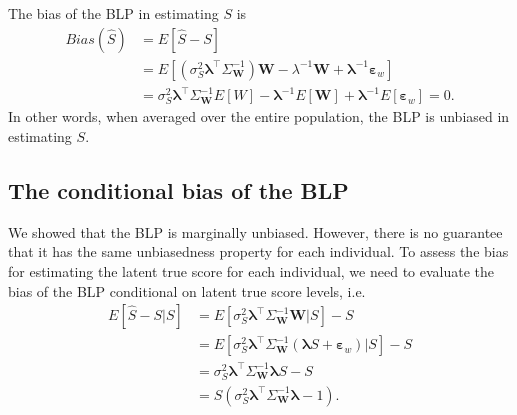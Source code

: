\documentclass[man, floatsintext]{apa7}
\newcommand{\mbf}[1]{\bm{#1}}
\newcommand{\blambda}{\mbf{\lambda}}
\newcommand{\bW}{\mbf{W}}
\begin{document}
  The bias of the BLP in estimating $S$ is
  \begin{align}
    Bias(\hat{S}) &= E[\hat{S} - S] \\
    &= E[(\sigma_S^2\blambda^\top \Sigma_{\bW}^{-1})\bW - \lambda^{-1}\bW +
    \blambda^{-1}\mbf{\varepsilon}_w] \\
    &= \sigma_S^2\blambda^\top \Sigma_{\bW}^{-1} E[W] - \blambda^{-1}E[\bW] +
    \blambda^{-1}E[\mbf{\varepsilon}_w] = 0.
  \end{align}
  In other words, when averaged over the entire population, the BLP is unbiased
  in estimating $S$.

  \subsection{The conditional bias of the BLP}
  We showed that the BLP is marginally unbiased. However, there is no
  guarantee that it has the same unbiasedness property for each individual. To
  assess the bias for estimating the latent true score for each individual, we
  need to evaluate the bias of the BLP conditional on latent true score levels,
  i.e.
  \begin{align}
    E[\hat{S} - S|S] &= E[\sigma_S^2\blambda^\top\Sigma_{\bW}^{-1}\bW|S] - S
    \nonumber\\
    &= E[\sigma_S^2\blambda^\top\Sigma_{\bW}^{-1}(\blambda S + 
    \mbf{\varepsilon}_w)|S] - S \nonumber\\
    &= \sigma_S^2\blambda^\top\Sigma_{\bW}^{-1}\blambda S - S \nonumber\\
    &= S(\sigma_S^2\blambda^\top\Sigma_{\bW}^{-1}\blambda - 1). 
    \label{eq:conditional_bias}
  \end{align}
\end{document}
